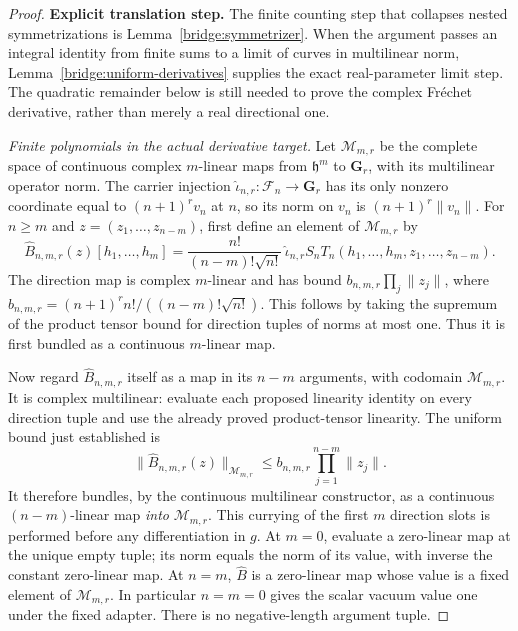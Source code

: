 \documentclass[11pt,a4paper]{article}
\theoremstyle{definition}
\theoremstyle{remark}
\begin{document}
\begin{proof}
\noindent\textbf{Explicit translation step.} The finite counting step that collapses nested symmetrizations is
Lemma~\ref{bridge:symmetrizer}. When the argument passes an integral
identity from finite sums to a limit of curves in multilinear norm,
Lemma~\ref{bridge:uniform-derivatives} supplies the exact real-parameter
limit step. The quadratic remainder below is still needed to prove the
complex Fr\'echet derivative, rather than merely a real directional one.

\emph{Finite polynomials in the actual derivative target.}
Let $\mathcal M_{m,r}$ be the complete space of continuous complex
$m$-linear maps from $\mathfrak h^m$ to $\mathbf G_r$, with
its multilinear operator norm. The carrier injection
$\widehat\iota_{n,r}:\mathcal F_n\to\mathbf G_r$ has its only
nonzero coordinate equal to $(n+1)^rv_n$ at $n$, so its norm
on $v_n$ is $(n+1)^r\|v_n\|$. For $n\geq m$ and
$z=(z_1,\ldots,z_{n-m})$, first define an element of
$\mathcal M_{m,r}$ by
\[
 \widehat B_{n,m,r}(z)[h_1,\ldots,h_m]
  =\frac{n!}{(n-m)!\sqrt{n!}}\,
    \widehat\iota_{n,r}S_nT_n(h_1,\ldots,h_m,z_1,\ldots,z_{n-m}).
\]
The direction map is complex $m$-linear and has bound
$b_{n,m,r}\prod_j\|z_j\|$, where
$b_{n,m,r}=(n+1)^r n!/((n-m)!\sqrt{n!})$.
This follows by taking the supremum of the product tensor bound
for direction tuples of norms at most one. Thus it is first
bundled as a continuous $m$-linear map.

Now regard $\widehat B_{n,m,r}$ itself as a map in its $n-m$
arguments, with codomain $\mathcal M_{m,r}$. It is complex
multilinear: evaluate each proposed linearity identity on every
direction tuple and use the already proved product-tensor linearity.
The uniform bound just established is
\[
 \|\widehat B_{n,m,r}(z)\|_{\mathcal M_{m,r}}
       \leq b_{n,m,r}\prod_{j=1}^{n-m}\|z_j\|.
\]
It therefore bundles, by the continuous multilinear constructor,
as a continuous $(n-m)$-linear map \emph{into}
$\mathcal M_{m,r}$. This currying of the first $m$ direction
slots is performed before any differentiation in $g$.
At $m=0$, evaluate a zero-linear map at the unique empty tuple;
its norm equals the norm of its value, with inverse the constant
zero-linear map. At $n=m$, $\widehat B$ is a zero-linear map
whose value is a fixed element of $\mathcal M_{m,r}$.
In particular $n=m=0$ gives the scalar vacuum value one under
the fixed adapter. There is no negative-length argument tuple.


\end{proof}
\end{document}
